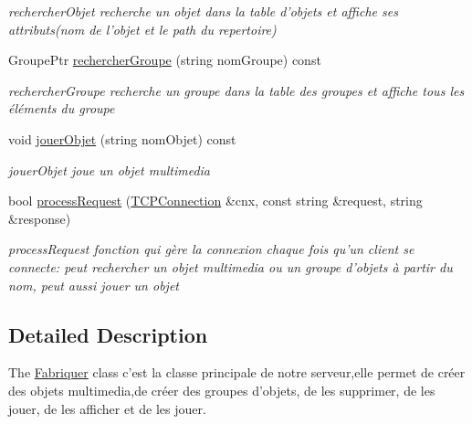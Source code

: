 \begin{DoxyCompactItemize}
\begin{DoxyCompactList}\small\item\em rechercher\+Objet recherche un objet dans la table d'objets et affiche ses attributs(nom de l'objet et le path du repertoire) \end{DoxyCompactList}\item 
Groupe\+Ptr \hyperlink{class_fabriquer_a70a1e7aab8a02d513f9df4a4a3bd4670}{rechercher\+Groupe} (string nom\+Groupe) const 
\begin{DoxyCompactList}\small\item\em rechercher\+Groupe recherche un groupe dans la table des groupes et affiche tous les éléments du groupe \end{DoxyCompactList}\item 
void \hyperlink{class_fabriquer_a7b38cc395f557fe9de2632f8889afa59}{jouer\+Objet} (string nom\+Objet) const 
\begin{DoxyCompactList}\small\item\em jouer\+Objet joue un objet multimedia \end{DoxyCompactList}\item 
bool \hyperlink{class_fabriquer_a397d5ea032597d8e8c87d4f4f996b451}{process\+Request} (\hyperlink{classcppu_1_1_t_c_p_connection}{T\+C\+P\+Connection} \&cnx, const string \&request, string \&response)
\begin{DoxyCompactList}\small\item\em process\+Request fonction qui gère la connexion chaque fois qu'un client se connecte\+: peut rechercher un objet multimedia ou un groupe d'objets à partir du nom, peut aussi jouer un objet \end{DoxyCompactList}\end{DoxyCompactItemize}


\subsection{Detailed Description}
The \hyperlink{class_fabriquer}{Fabriquer} class c'est la classe principale de notre serveur,elle permet de créer des objets multimedia,de créer des groupes d'objets, de les supprimer, de les jouer, de les afficher et de les jouer. 

